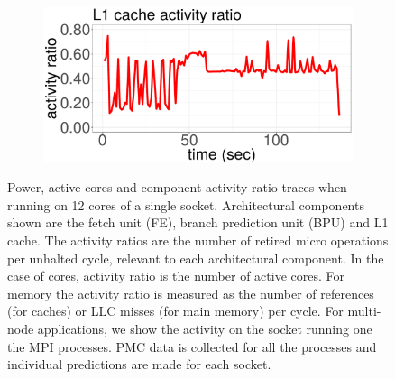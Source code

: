 \begin{figure}[p]
\begin{subfigure}[b]{.48\textwidth}
  \end{subfigure}%
~
	\begin{subfigure}[b]{.48\textwidth}
  	\includegraphics[width=\textwidth]{power_aware_job_scheduling/figures/activity_ratios/bodytrack_MEM}
  \end{subfigure}%
	\caption{Power, active cores and component activity ratio traces when running on 12 cores of a single socket.  Architectural components shown are the fetch unit (FE), branch prediction unit (BPU)
					and L1 cache.  The activity ratios are the number of retired micro operations per unhalted cycle, relevant to each architectural component.
					In the case of cores, activity ratio is the number of active cores.  For memory the activity ratio is measured as the number of references (for caches) or LLC misses (for main memory) per cycle.
					For multi-node applications, we show the activity on the socket running one the MPI processes.  PMC data is collected for all the processes and individual predictions are made for each socket.}
	\label{fig:component_activity_ratios_single_node}
	\vspace{.5cm}
\end{figure}

